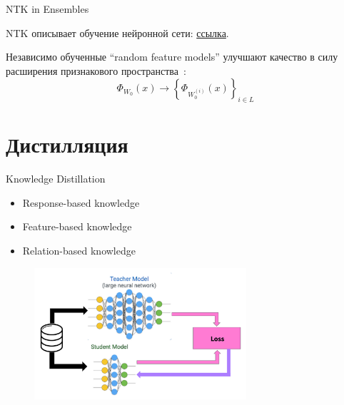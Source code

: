 \documentclass[9pt]{beamer}
\begin{document}
\begin{frame}{NTK in Ensembles}
    \begin{block}{}
        NTK описывает обучение нейронной сети: \href{https://upload.wikimedia.org/wikipedia/commons/0/04/NTK_evolution.gif}{ссылка}.
    \end{block}

    \begin{block}{}
        Независимо обученные ``random feature models'' улучшают качество в силу расширения признакового пространства~\cite{ntk1}: \[ \Phi_{W_0}(x) \to \left\{ \Phi_{W_0^{(i)}}(x) \right\}_{i \in L} \]
    \end{block}
\end{frame}

\section{Дистилляция}

\begin{frame}{Knowledge Distillation}
    \begin{block}{}
        \begin{itemize}
            \item Response-based knowledge
            \item Feature-based knowledge
            \item Relation-based knowledge
        \end{itemize}
    \end{block}

    \begin{figure}
        \centering
        \includegraphics[width=0.7\textwidth]{images/image6.png}
    \end{figure}
\end{frame}
\end{document}
